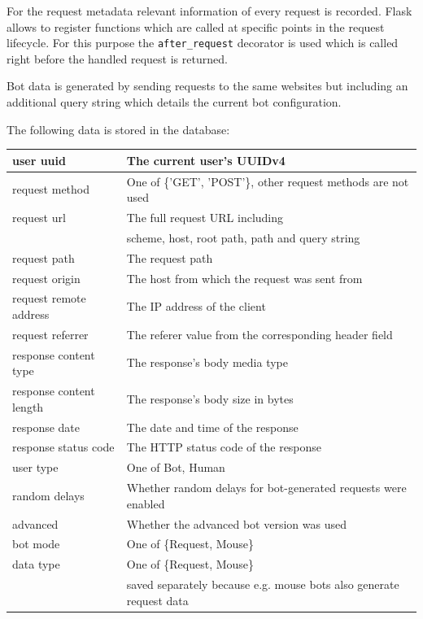 \documentclass[
    fontsize=12pt,
    headings=small,
    parskip=half,           %
    bibliography=totoc,
    numbers=noenddot,       %
    open=any,               %
    final                   %
]{scrreprt}
\begin{document}
For the request metadata relevant information of every request is recorded. Flask allows to register functions which are called at specific points in the request lifecycle. For this purpose the \lstinline{after_request} decorator is used which is called right before the handled request is returned.

Bot data is generated by sending requests to the same websites but including an additional query string which details the current bot configuration.

The following data is stored in the database:

\begin{table}[]
\begin{tabular}{|l|l|}
\hline
user uuid & The current user's UUIDv4 \\ \hline
request method & One of \{'GET', 'POST'\}, other request methods are not used \\ \hline
request url & The full request URL including \\ & scheme, host, root path, path and query string \\ \hline
request path & The request path \\ \hline
request origin & The host from which the request was sent from \\ \hline
request remote address & The IP address of the client \\ \hline
request referrer & The referer value from the corresponding header field \\ \hline
response content type & The response's body media type \\ \hline
response content length & The response's body size in bytes \\ \hline
response date & The date and time of the response \\ \hline
response status code & The HTTP status code of the response \\ \hline
user type & One of {Bot, Human} \\ \hline
random delays & Whether random delays for bot-generated requests were enabled \\ \hline
advanced & Whether the advanced bot version was used \\ \hline
bot mode & One of \{Request, Mouse\} \\ \hline
data type & One of \{Request, Mouse\} \\ & saved separately because e.g. mouse bots also generate request data \\ \hline

\end{tabular}
\end{table}
\end{document}
